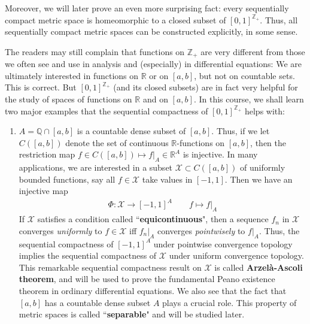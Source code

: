 \documentclass[12pt,b5paper,notitlepage]{article}
\theoremstyle{definition}
\theoremstyle{plain}
\newcommand{\mc}{\mathcal}
\newcommand{\Zbb}{\mathbb Z}
\newcommand{\Qbb}{\mathbb Q}
\newcommand{\Rbb}{\mathbb R}
\numberwithin{equation}{section}
\begin{document}
Moreover, we will later prove an even more surprising fact: every sequentially compact metric space is homeomorphic to a closed subset of $[0,1]^{\Zbb_+}$. Thus, all sequentially compact metric spaces can be constructed explicitly, in some sense.

The readers may still complain that functions on $\Zbb_+$ are very different from those we often see and use in analysis and (especially) in differential equations: We are ultimately interested in functions on $\Rbb$ or on $[a,b]$, but not on countable sets. This is correct. But $[0,1]^{\Zbb_+}$ (and its closed subsets) are in fact very helpful for the study of spaces of functions on $\Rbb$ and on $[a,b]$. In this course, we shall learn two major examples that the sequential compactness of $[0,1]^{\Zbb_+}$ helps with:
\begin{enumerate}
\item $A=\Qbb\cap[a,b]$ is a countable dense subset of $[a,b]$. Thus, if we let $C([a,b])$ denote the set of continuous $\Rbb$-functions on $[a,b]$, then the restriction map $f\in C([a,b])\mapsto f|_A\in\Rbb^A$ is injective. In many applications, we are interested in a subset $\mc X\subset C([a,b])$ of uniformly bounded functions, say all $f\in\mc X$ take values in $[-1,1]$. Then we have an injective map
\begin{align*}
\Phi:\mc X\rightarrow [-1,1]^A\qquad f\mapsto f|_A
\end{align*}
If $\mc X$ satisfies a condition called ``\textbf{equicontinuous}", then  a sequence $f_n$ in $\mc X$ converges \emph{uniformly} to $f\in\mc X$ iff $f_n|_A$ converges \emph{pointwisely} to $f|_A$. Thus, the sequential compactness of $[-1,1]^A$ under pointwise convergence topology implies the sequential compactness of $\mc X$ under uniform convergence topology. This remarkable sequential compactness result on $\mc X$ is called \textbf{Arzel\`a-Ascoli theorem}, and will be used to prove the fundamental Peano existence theorem in ordinary differential equations. We also see that the fact that $[a,b]$ has a countable dense subset $A$ plays a crucial role. This property of metric spaces is called ``\textbf{separable}" and will be studied later.


\end{enumerate}
\end{document}
